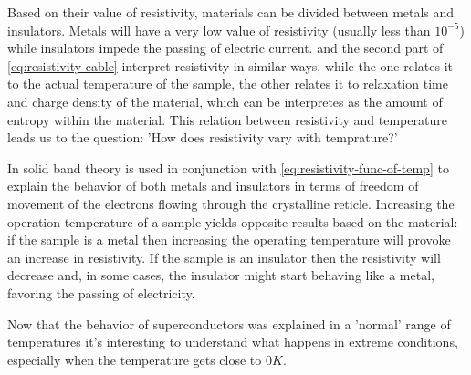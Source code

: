 \medskip

Based on their value of resistivity, materials can be divided between metals and insulators. Metals
will have a very low value of resistivity (usually less than $10^{-5}$) while insulators impede the
passing of electric current.  and the second part of \cref{eq:resistivity-cable} interpret
resistivity in similar ways, while the one relates it to the actual temperature of the sample, the
other relates it to relaxation time and charge density of the material, which can be interpretes as
the amount of entropy within the material. This relation between resistivity and temperature leads
us to the question: 'How does resistivity vary with temprature?'

\smallskip

In \cite{slimani2022superconducting} solid band theory is used in conjunction with \cref{eq:resistivity-func-of-temp} to explain the behavior of both metals and insulators in terms of
freedom of movement of the electrons flowing through the crystalline reticle. Increasing the
operation temperature of a sample yields opposite results based on the material: if the sample is a
metal then increasing the operating temperature will provoke an increase in resistivity. If the
sample is an insulator then the resistivity will decrease and, in some cases, the insulator might
start behaving like a metal, favoring the passing of electricity.

\medskip

Now that the behavior of superconductors was explained in a 'normal' range of temperatures it's
interesting to understand what happens in extreme conditions, especially when the temperature gets
close to $0K$.

\smallskip

